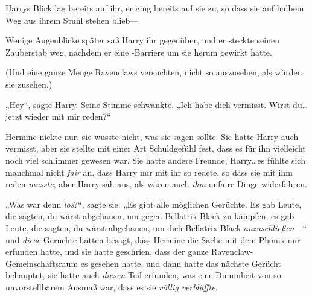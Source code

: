 Harrys Blick lag bereits auf ihr, er ging bereits auf sie zu, so dass sie auf halbem Weg aus ihrem Stuhl stehen blieb—

Wenige Augenblicke später saß Harry ihr gegenüber, und er steckte seinen Zauberstab weg, nachdem er eine -Barriere um sie herum gewirkt hatte.

(Und eine ganze Menge Ravenclaws versuchten, nicht so auszusehen, als würden sie zusehen.)

„Hey“, sagte Harry. Seine Stimme schwankte. „Ich habe dich vermisst. Wirst du…jetzt wieder mit mir reden?“

Hermine nickte nur, sie wusste nicht, was sie sagen sollte. Sie hatte Harry auch vermisst, aber sie stellte mit einer Art Schuldgefühl fest, dass es für ihn vielleicht noch viel schlimmer gewesen war. Sie hatte andere Freunde, Harry…es fühlte sich manchmal nicht \emph{fair} an, dass Harry nur mit ihr so redete, so dass sie mit ihm reden \emph{musste}; aber Harry sah aus, als wären auch \emph{ihm} unfaire Dinge widerfahren.

„Was war denn \emph{los}?“, sagte sie. „Es gibt alle möglichen Gerüchte. Es gab Leute, die sagten, du wärst abgehauen, um gegen Bellatrix Black zu kämpfen, es gab Leute, die sagten, du wärst abgehauen, um dich Bellatrix Black \emph{anzuschließen}—“ und \emph{diese} Gerüchte hatten besagt, dass Hermine die Sache mit dem Phönix nur erfunden hatte, und sie hatte geschrien, dass der ganze Ravenclaw-Gemeinschaftsraum es gesehen hatte, und dann hatte das nächste Gerücht behauptet, sie hätte auch \emph{diesen} Teil erfunden, was eine Dummheit von so unvorstellbarem Ausmaß war, dass es sie \emph{völlig verblüffte}.

